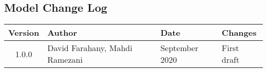 \documentclass[11pt,letterpaper]{article}
\begin{document}
\subsection{Model Change Log} \label{app:log}
\begin{table}[h!]
	\centering
	\renewcommand{\arraystretch}{1.2}
	\begin{tabular}{|c|l|l|l|}
	\hline
	\textbf{Version} & \textbf{Author} & \textbf{Date} & \textbf{Changes}\\ \hline
	1.0.0 & David Farahany, Mahdi Ramezani & September 2020 & First draft\\ \hline
	\hline
	\end{tabular}
\end{table}

\newpage


\end{document}
